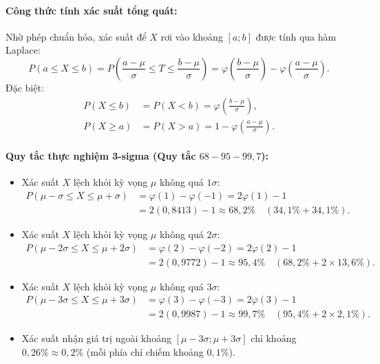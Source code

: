 \paragraph{Công thức tính xác suất tổng quát:}
Nhờ phép chuẩn hóa, xác suất để $X$ rơi vào khoảng $[a; b]$ được tính qua hàm Laplace:
\[
P(a \le X \le b) = P\left(\frac{a - \mu}{\sigma} \le T \le \frac{b - \mu}{\sigma}\right) = \varphi\left(\frac{b - \mu}{\sigma}\right) - \varphi\left(\frac{a - \mu}{\sigma}\right).
\]
Đặc biệt:
\begin{align*}
P(X \le b) &= P(X < b) = \varphi\left(\frac{b - \mu}{\sigma}\right), \\
P(X \ge a) &= P(X > a) = 1 - \varphi\left(\frac{a - \mu}{\sigma}\right).
\end{align*}

\paragraph{Quy tắc thực nghiệm 3-sigma (Quy tắc $68 - 95 - 99{,}7$):}
\begin{itemize}
    \item Xác suất $X$ lệch khỏi kỳ vọng $\mu$ không quá $1\sigma$:
    \begin{align*}
    P(\mu - \sigma \le X \le \mu + \sigma) &= \varphi(1) - \varphi(-1) = 2\varphi(1) - 1 \\
    &= 2(0{,}8413) - 1 \approx 68{,}2\% \quad (34{,}1\% + 34{,}1\%).
    \end{align*}
    \item Xác suất $X$ lệch khỏi kỳ vọng $\mu$ không quá $2\sigma$:
    \begin{align*}
    P(\mu - 2\sigma \le X \le \mu + 2\sigma) &= \varphi(2) - \varphi(-2) = 2\varphi(2) - 1 \\
    &= 2(0{,}9772) - 1 \approx 95{,}4\% \quad (68{,}2\% + 2 \times 13{,}6\%).
    \end{align*}
    \item Xác suất $X$ lệch khỏi kỳ vọng $\mu$ không quá $3\sigma$:
    \begin{align*}
    P(\mu - 3\sigma \le X \le \mu + 3\sigma) &= \varphi(3) - \varphi(-3) = 2\varphi(3) - 1 \\
    &= 2(0{,}9987) - 1 \approx 99{,}7\% \quad (95{,}4\% + 2 \times 2{,}1\%).
    \end{align*}
    \item Xác suất nhận giá trị ngoài khoảng $[\mu - 3\sigma; \mu + 3\sigma]$ chỉ khoảng $0{,}26\% \approx 0{,}2\%$ (mỗi phía chỉ chiếm khoảng $0{,}1\%$).
\end{itemize}

